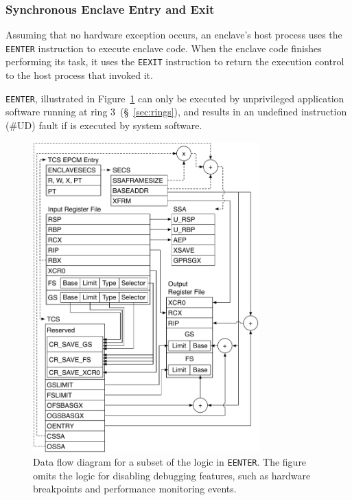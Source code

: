 \subsubsection{Synchronous Enclave Entry and Exit}
\label{sec:sgx_enclave_mode}
\label{sec:sgx_eenter}
\label{sec:sgx_eexit}

Assuming that no hardware exception occurs, an enclave's host process uses the
\texttt{EENTER} instruction to execute enclave code. When the enclave code
finishes performing its task, it uses the \texttt{EEXIT} instruction to return
the execution control to the host process that invoked it.


\texttt{EENTER}, illustrated in Figure~\ref{fig:sgx_eenter} can only be
executed by unprivileged application software running at ring
3~(\S~\ref{sec:rings}), and results in an undefined instruction (\#UD) fault if
is executed by system software.

\begin{figure}[hbt]
  \centering
  \includegraphics[width=87mm]{figures/sgx_eenter.pdf}
  \caption{
    Data flow diagram for a subset of the logic in \texttt{EENTER}. The figure
    omits the logic for disabling debugging features, such as hardware
    breakpoints and performance monitoring events.
  }
  \label{fig:sgx_eenter}
\end{figure}

